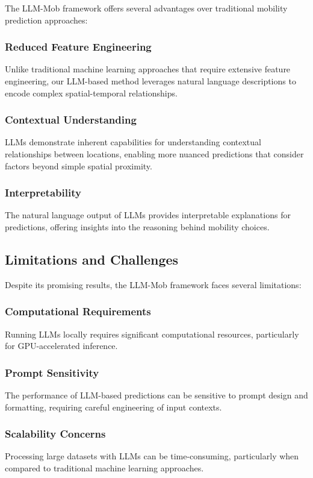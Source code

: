 \documentclass[12pt,a4paper]{article}
\begin{document}
The LLM-Mob framework offers several advantages over traditional mobility prediction approaches:

\subsubsection{Reduced Feature Engineering}
Unlike traditional machine learning approaches that require extensive feature engineering, our LLM-based method leverages natural language descriptions to encode complex spatial-temporal relationships.

\subsubsection{Contextual Understanding}
LLMs demonstrate inherent capabilities for understanding contextual relationships between locations, enabling more nuanced predictions that consider factors beyond simple spatial proximity.

\subsubsection{Interpretability}
The natural language output of LLMs provides interpretable explanations for predictions, offering insights into the reasoning behind mobility choices.

\subsection{Limitations and Challenges}

Despite its promising results, the LLM-Mob framework faces several limitations:

\subsubsection{Computational Requirements}
Running LLMs locally requires significant computational resources, particularly for GPU-accelerated inference.

\subsubsection{Prompt Sensitivity}
The performance of LLM-based predictions can be sensitive to prompt design and formatting, requiring careful engineering of input contexts.

\subsubsection{Scalability Concerns}
Processing large datasets with LLMs can be time-consuming, particularly when compared to traditional machine learning approaches.
\end{document}
